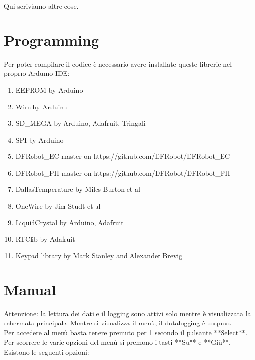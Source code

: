 \documentclass[]{article}
\begin{document}
Qui scriviamo altre cose.

\section{Programming}
Per poter compilare il codice è necessario avere installate queste librerie nel proprio Arduino IDE:
\begin{enumerate}
\item {EEPROM by Arduino}
\item {Wire by Arduino}
\item {SD\_MEGA by Arduino, Adafruit, Tringali}
\item {SPI by Arduino}
\item {DFRobot\_EC-master on https://github.com/DFRobot/DFRobot\_EC}
\item {DFRobot\_PH-master on https://github.com/DFRobot/DFRobot\_PH}
\item {DallasTemperature by Miles Burton et al}
\item {OneWire by Jim Studt et al}
\item {LiquidCrystal by Arduino, Adafruit}
\item {RTClib by Adafruit}
\item {Keypad library by Mark Stanley and Alexander Brevig}
\end{enumerate}

\section{Manual}
Attenzione: la lettura dei dati e il logging sono attivi solo mentre è visualizzata la schermata principale. Mentre si visualizza il menù, il datalogging è sospeso. \\
Per accedere al menù basta tenere premuto per 1 secondo il pulsante **Select**. Per scorrere le varie opzioni del menù si premono i tasti **Su** e **Giù**.
Esistono le seguenti opzioni:\\
\end{document}
